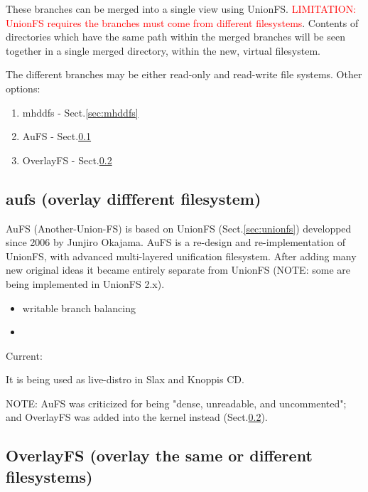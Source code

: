 These branches can be merged into a single view using UnionFS.
\textcolor{red}{LIMITATION: UnionFS requires the branches must come from
different filesystems}. Contents of directories which have the same path within
the merged branches will be seen together in a single merged directory, within
the new, virtual filesystem.

The different branches may be either read-only and read-write file systems.
Other options:
\begin{enumerate}
  \item mhddfs - Sect.\ref{sec:mhddfs}
  
  \item AuFS - Sect.\ref{sec:aufs}
  
  \item OverlayFS - Sect.\ref{sec:OverlayFS}
\end{enumerate}


\subsection{aufs (overlay diffferent filesystem)}
\label{sec:aufs}

AuFS (Another-Union-FS) is based on UnionFS (Sect.\ref{sec:unionfs}) developped
since 2006 by Junjiro Okajama.
AuFS is a re-design and re-implementation of UnionFS, with advanced
multi-layered unification filesystem. After adding many new original ideas it
became entirely separate from UnionFS (NOTE: some are being implemented in
UnionFS 2.x).
\begin{itemize}
  \item   writable branch balancing
  
  \item 
\end{itemize}

Current: 

It is being used as live-distro in Slax and Knoppis CD.


NOTE: AuFS was criticized for being "dense, unreadable, and uncommented"; and
OverlayFS was added into the kernel instead (Sect.\ref{sec:OverlayFS}).


\subsection{OverlayFS (overlay the same or different filesystems)}
\label{sec:OverlayFS}

